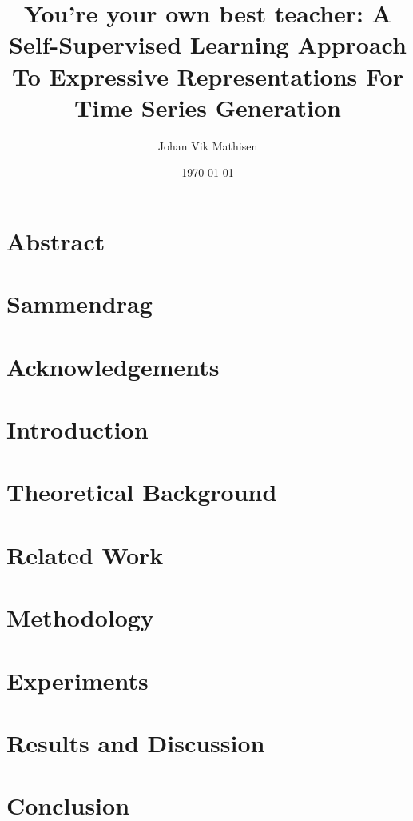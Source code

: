 \documentclass[british]{ntnuthesis}
\title{You're your own best teacher: A Self-Supervised Learning Approach To Expressive Representations For Time Series Generation}
\author{Johan Vik Mathisen}
\date{\today}
\begin{document}
\chapter*{Abstract}


\chapter*{Sammendrag}

\chapter*{Acknowledgements}


\tableofcontents

\chapter{Introduction}


\chapter{Theoretical Background}


\chapter{Related Work}


\chapter{Methodology}


\chapter{Experiments}


\chapter{Results and Discussion}


\chapter{Conclusion}


\chapter*{\bibname}
\printbibliography[heading=none]

% 

% 
\end{document}
